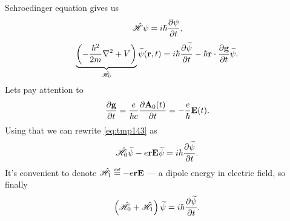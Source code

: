 Schroedinger equation gives us
\begin{equation}
	\hat{\mathscr{H}} \psi = i \hbar \dfrac{\partial {\psi}}{\partial {t}},
\end{equation}
\begin{equation}
	\underbrace{\left( - \frac{\hbar^2}{2m} \nabla^2 + V \right)}_{\hat{\mathscr{H}}_0} \widetilde{\psi} (\mathbf{r},t) = i \hbar \dfrac{\partial {\widetilde{\psi}}}{\partial {t}} - \hbar \mathbf{r} \cdot \dfrac{\partial {\mathbf{g}}}{\partial {t}} \widetilde{\psi}.
	\label{eq:tmp143}
\end{equation} 
Lets pay attention to  
\begin{equation}
	\dfrac{\partial {\mathbf{g}}}{\partial {t}} = \frac{e}{\hbar c} \dfrac{\partial {\mathbf{A}_0(t)}}{\partial {t}} = - \frac{e}{\hbar} \mathbf{E}(t).
\end{equation}
Using that we can rewrite \eqref{eq:tmp143} as
\begin{equation}
	\hat{\mathscr{H}}_0 \widetilde{\psi} - e \mathbf{r} \mathbf{E} \widetilde{\psi} = i \hbar \dfrac{\partial {\widetilde{\psi}}}{\partial {t}}.
\end{equation}
It's convenient to denote $\hat{\mathscr{H}}_1 \myeq - e \vec{r} \vec{E}$ --- a dipole energy in electric field, so finally
\begin{equation}
	\left( \hat{\mathscr{H}}_0 + \hat{\mathscr{H}}_1 \right) \widetilde{\psi} = i \hbar \dfrac{\partial {\widetilde{\psi}}}{\partial {t}}.
\end{equation}

